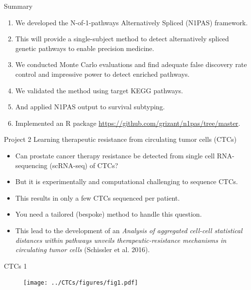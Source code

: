 \documentclass[ignorenonframetext,aspectratio=169,]{beamer}
\providecommand{\tightlist}{%
  \setlength{\itemsep}{0pt}\setlength{\parskip}{0pt}}
\begin{document}
\begin{frame}{%
\protect\hypertarget{summary}{%
Summary}}

\begin{enumerate}
  \item We developed the N-of-1-pathways Alternatively Spliced (N1PAS) framework.
    \item This will provide a single-subject method to detect alternatively spliced genetic pathways to enable precision medicine.
    \item We conducted Monte Carlo evaluations and find adequate false discovery rate control and impressive power to detect enriched pathways.
    \item We validated the method using target KEGG pathways.
    \item And applied N1PAS output to survival subtyping.
    \item Implemented an R package \url{https://github.com/grizant/n1pas/tree/master}.
  \end{enumerate}

\end{frame}

\begin{frame}{%
\protect\hypertarget{project-2-learning-therapeutic-resistance-from-circulating-tumor-cells-ctcs}{%
Project 2 Learning therapeutic resistance from circulating tumor cells
(CTCs)}}

\begin{itemize}
\tightlist
\item
  Can prostate cancer therapy resistance be detected from single cell
  RNA-sequencing (scRNA-seq) of CTCs?
\item
  But it is experimentally and computational challenging to sequence
  CTCs.
\item
  This results in only a few CTCs sequenced per patient.
\item
  You need a tailored (bespoke) method to handle this question.
\item
  This lead to the development of an \emph{Analysis of aggregated
  cell-cell statistical distances within pathways unveils
  therapeutic-resistance mechanisms in circulating tumor cells}
  (Schissler et al. 2016).
\end{itemize}

\end{frame}

\begin{frame}{%
\protect\hypertarget{ctcs-1}{%
CTCs 1}}

\begin{figure}[htb]
  \centering \texttt{[image: ../CTCs/figures/fig1.pdf]}
\end{figure}

\end{frame}
\end{document}
